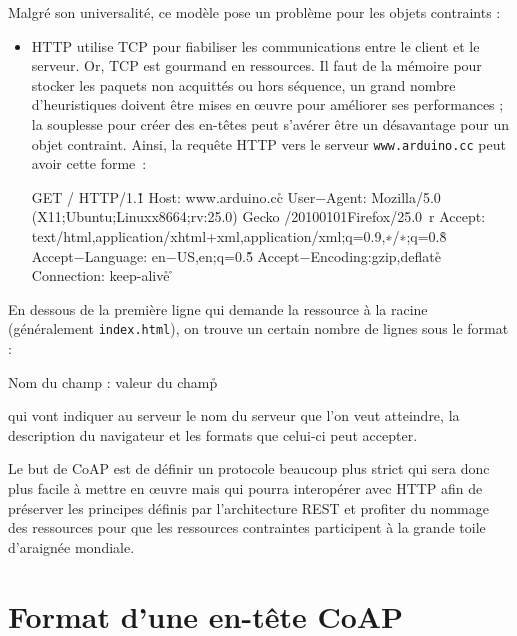          \vspace{1em}

Malgré son universalité, ce modèle pose un problème pour les objets contraints :

\begin{itemize}
\item HTTP utilise TCP pour fiabiliser les communications entre le client et le serveur. Or, TCP est gourmand en ressources. Il faut de la mémoire pour stocker les paquets non acquittés ou hors séquence, un grand nombre d’heuristiques doivent être mises en œuvre pour améliorer ses performances ;
la souplesse pour créer des en-têtes peut s'avérer être un désavantage pour un objet contraint. Ainsi, la requête \ac{HTTP} vers le serveur \texttt{www.arduino.cc} peut avoir cette forme~:
\begin{termc}[backgroundcolor=\color{blue!10}, basicstyle=\ttfamily\tiny, escapechar=@]
GET / HTTP/1.1\r \n
Host: www.arduino.cc\r\n
User−Agent: Mozilla/5.0 (X11;Ubuntu;Linuxx8664;rv:25.0) Gecko /20100101Firefox/25.0\ r\n
Accept: text/html,application/xhtml+xml,application/xml;q=0.9,∗/∗;q=0.8\r\n
Accept−Language: en−US,en;q=0.5\r\n
Accept−Encoding:gzip,deflate\r\n
Connection: keep-alive\r\n
\r \n
\end{termc}
\end{itemize}


En dessous de la première ligne qui demande la ressource à la racine (généralement \texttt{index.html}), on trouve un certain nombre de lignes sous le format :

\begin{termc}[backgroundcolor=\color{blue!10}, basicstyle=\ttfamily\tiny, escapechar=@]
Nom du champ : valeur du champ\r\n
\end{termc}

\noindent qui vont indiquer au serveur le nom du serveur que l’on veut atteindre, la description du navigateur et les formats que celui-ci peut accepter. 


         \vspace{1em}
         
         

Le but de CoAP est de définir un protocole beaucoup plus strict qui sera donc plus facile à mettre en œuvre mais qui pourra interopérer avec HTTP afin de préserver les principes définis par l’architecture REST et profiter du nommage des ressources pour que les ressources contraintes participent à la grande toile d'araignée mondiale.

\section{Format d'une en-tête CoAP}

